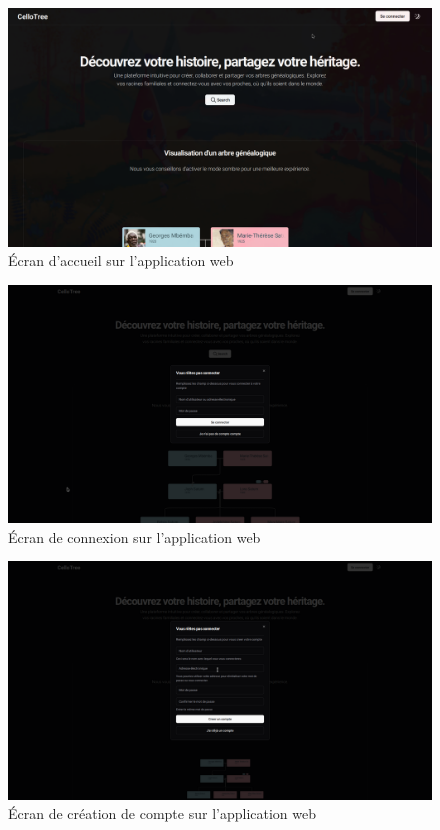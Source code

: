\begin{figure}[H]
  \centering
  \includegraphics[width=1\textwidth]{./capture/home.png}
  \caption{Écran d'accueil sur l'application web}
\end{figure}

\begin{figure}[H]
  \centering
  \includegraphics[width=1\textwidth]{capture/login.png}
  \caption{Écran de connexion sur l'application web}
\end{figure}

\begin{figure}[H]
  \centering
  \includegraphics[width=1\textwidth]{capture/signup.png}
  \caption{Écran de création de compte sur l'application web}
\end{figure}

